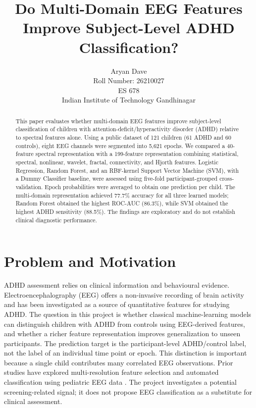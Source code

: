 \documentclass{article}
\title{Do Multi-Domain EEG Features Improve Subject-Level ADHD Classification?}
\author{%
  Aryan Dave \\
  Roll Number: 26210027 \\
  ES 678 \\
  Indian Institute of Technology Gandhinagar
}
\begin{document}
\maketitle

\begin{abstract}
This paper evaluates whether multi-domain EEG features improve subject-level classification of children with attention-deficit/hyperactivity disorder (ADHD) relative to spectral features alone. Using a public dataset of 121 children (61 ADHD and 60 controls), eight EEG channels were segmented into 5,621 epochs. We compared a 40-feature spectral representation with a 199-feature representation combining statistical, spectral, nonlinear, wavelet, fractal, connectivity, and Hjorth features. Logistic Regression, Random Forest, and an RBF-kernel Support Vector Machine (SVM), with a Dummy Classifier baseline, were assessed using five-fold participant-grouped cross-validation. Epoch probabilities were averaged to obtain one prediction per child. The multi-domain representation achieved 77.7\% accuracy for all three learned models; Random Forest obtained the highest ROC-AUC (86.3\%), while SVM obtained the highest ADHD sensitivity (88.5\%). The findings are exploratory and do not establish clinical diagnostic performance.
\end{abstract}

\section{Problem and Motivation}
ADHD assessment relies on clinical information and behavioural evidence. Electroencephalography (EEG) offers a non-invasive recording of brain activity and has been investigated as a source of quantitative features for studying ADHD. The question in this project is whether classical machine-learning models can distinguish children with ADHD from controls using EEG-derived features, and whether a richer feature representation improves generalization to unseen participants. The prediction target is the participant-level ADHD/control label, not the label of an individual time point or epoch. This distinction is important because a single child contributes many correlated EEG observations. Prior studies have explored multi-resolution feature selection and automated classification using pediatric EEG data \citep{attallah2024,alim2023}. The project investigates a potential screening-related signal; it does not propose EEG classification as a substitute for clinical assessment.
\end{document}
